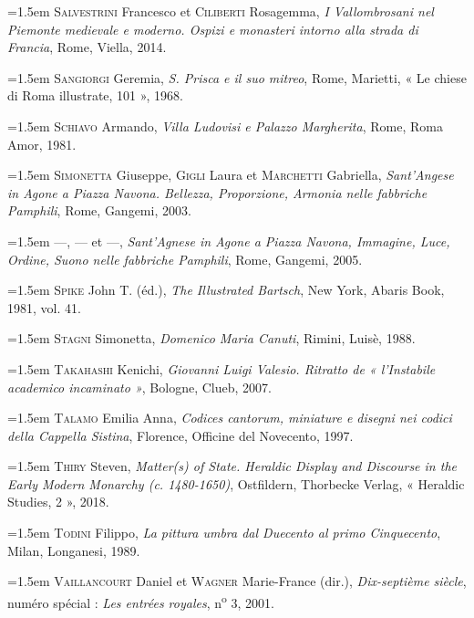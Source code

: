 \documentclass[12pt,twoside,openany]{book}
\newenvironment{PurhBibliography}
  {%
    \par
    \setlength{\parindent}{0pt}%
    \setlength{\leftskip}{0pt}%
  }
  {%
    \par
  }
\begin{document}
\begin{PurhBibliography}
\noindent\hangindent=1.5em \textsc{Salvestrini} Francesco et \textsc{Ciliberti} Rosagemma, \textit{I Vallombrosani nel Piemonte medievale e moderno. Ospizi e monasteri intorno alla strada di Francia}, Rome, Viella, 2014.\par
\noindent\hangindent=1.5em \textsc{Sangiorgi} Geremia, \textit{S. Prisca e il suo mitreo}, Rome, Marietti, « Le chiese di Roma illustrate, 101 », 1968.\par
\noindent\hangindent=1.5em \textsc{Schiavo} Armando, \textit{Villa Ludovisi e Palazzo Margherita}, Rome, Roma Amor, 1981.\par
\noindent\hangindent=1.5em \textsc{Simonetta} Giuseppe, \textsc{Gigli} Laura et \textsc{Marchetti} Gabriella, \textit{Sant’Angese in Agone a Piazza Navona. Bellezza, Proporzione, Armonia nelle fabbriche Pamphili}, Rome, Gangemi, 2003.\par
\noindent\hangindent=1.5em \textsc{—}, \textsc{—} et \textsc{—}, \textit{Sant’Agnese in Agone a Piazza Navona, Immagine, Luce, Ordine, Suono nelle fabbriche Pamphili}, Rome, Gangemi, 2005.\par
\noindent\hangindent=1.5em \textsc{Spike} John T. (éd.), \textit{The Illustrated Bartsch}, New York, Abaris Book, 1981, vol. 41.\par
\noindent\hangindent=1.5em \textsc{Stagni} Simonetta, \textit{Domenico Maria Canuti}, Rimini, Luisè, 1988.\par
\noindent\hangindent=1.5em \textsc{Takahashi} Kenichi, \textit{Giovanni Luigi Valesio. Ritratto de « l’Instabile academico incaminato »}, Bologne, Clueb, 2007.\par
\noindent\hangindent=1.5em \textsc{Talamo} Emilia Anna, \textit{Codices cantorum, miniature e disegni nei codici della Cappella Sistina}, Florence, Officine del Novecento, 1997.\par
\noindent\hangindent=1.5em \textsc{Thiry} Steven, \textit{Matter(s) of State. Heraldic Display and Discourse in the Early Modern Monarchy (c. 1480-1650)}, Ostfildern, Thorbecke Verlag, « Heraldic Studies, 2 », 2018.\par
\noindent\hangindent=1.5em \textsc{Todini} Filippo, \textit{La pittura umbra dal Duecento al primo Cinquecento}, Milan, Longanesi, 1989.\par
\noindent\hangindent=1.5em \textsc{Vaillancourt} Daniel et \textsc{Wagner} Marie-France (dir.), \textit{Dix-septième siècle}, numéro spécial :\textit{ Les entrées royales}, n\textsuperscript{o} 3, 2001.\par

\end{PurhBibliography}
\end{document}
